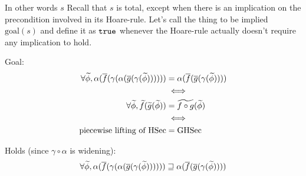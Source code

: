 \documentclass[11pt,a4paper]{article}
\begin{document}
\begin{description}
	
	
	In other words $s$
	Recall that $s$ is total, except when there is an implication on the precondition involved in its Hoare-rule.
	Let's call the thing to be implied $\text{goal}(s)$ and define it as $\texttt{true}$ whenever the Hoare-rule actually doesn't require any implication to hold.
	
\end{description}

Goal:
\begin{align*}
\forall \widetilde{\phi}, 
\alpha(\overline{f}(\gamma(\alpha(\overline{g}(\gamma(\widetilde{\phi})))))) &= \alpha(\overline{f}(\overline{g}(\gamma(\widetilde{\phi}))))\\
&\iff \\
\forall \widetilde{\phi}, 
\widetilde{f}(\widetilde{g}(\widetilde{\phi})) &= \widetilde{f \circ g}(\widetilde{\phi})\\
&\iff \\
\text{piecewise lifting of HSec} &= \text{GHSec}\\
\end{align*}

Holds (since $\gamma \circ \alpha$ is widening):
\begin{align*}
\forall \widetilde{\phi}, 
\alpha(\overline{f}(\gamma(\alpha(\overline{g}(\gamma(\widetilde{\phi})))))) &\sqsupseteq \alpha(\overline{f}(\overline{g}(\gamma(\widetilde{\phi}))))\\
\end{align*}
\end{document}
